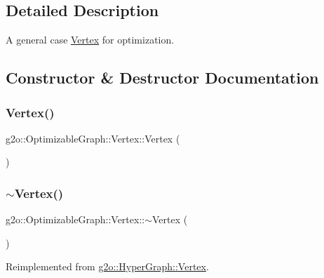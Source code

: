 \subsection{Detailed Description}
A general case \mbox{\hyperlink{classg2o_1_1_optimizable_graph_1_1_vertex}{Vertex}} for optimization. 

\subsection{Constructor \& Destructor Documentation}
\mbox{\label{classg2o_1_1_optimizable_graph_1_1_vertex_a1f5fd4210abfa0f8b8e7dd279f561986}} 
\subsubsection{\texorpdfstring{Vertex()}{Vertex()}}
{\footnotesize\ttfamily g2o\+::\+Optimizable\+Graph\+::\+Vertex\+::\+Vertex (\begin{DoxyParamCaption}{ }\end{DoxyParamCaption})}

\mbox{\label{classg2o_1_1_optimizable_graph_1_1_vertex_ac2208bfef95bba9670f13933d68fb929}} 
\subsubsection{\texorpdfstring{$\sim$\+Vertex()}{~Vertex()}}
{\footnotesize\ttfamily g2o\+::\+Optimizable\+Graph\+::\+Vertex\+::$\sim$\+Vertex (\begin{DoxyParamCaption}{ }\end{DoxyParamCaption})\hspace{0.3cm}{\ttfamily [virtual]}}



Reimplemented from \mbox{\hyperlink{classg2o_1_1_hyper_graph_1_1_vertex_a4c3da5bcc97c960c43bc49cc2ade649c}{g2o\+::\+Hyper\+Graph\+::\+Vertex}}.



